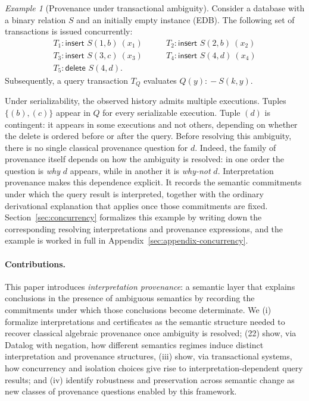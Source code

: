 \documentclass[acmsmall,nonacm]{acmart}
\theoremstyle{remark}
\newtheorem{example}{Example}
\numberwithin{definition}{section}
\numberwithin{theorem}{section}
\numberwithin{lemma}{section}
\numberwithin{corollary}{section}
\numberwithin{remark}{section}
\numberwithin{example}{section}
\numberwithin{observation}{section}
\numberwithin{assumption}{section}
\newcommand{\drule}{\mathrel{:\!-}}
\begin{document}
\begin{example}[Provenance under transactional ambiguity]
  \label{ex:example}
Consider a database with a binary relation $S$ 
and an initially empty instance (EDB).
The following set of transactions is issued concurrently:
\[
\begin{array}{ll}
T_1: \textsf{insert } S(1,b) \ (x_1) \qquad &
T_2: \textsf{insert } S(2,b) \ (x_2)\\
T_3: \textsf{insert } S(3,c) \ (x_3) \qquad &
T_4: \textsf{insert } S(4,d) \ (x_4)\\
T_5: \textsf{delete } S(4,d). &
\end{array}
\]
Subsequently, a query transaction $T_Q$ evaluates $Q(y) \drule S(k,y)$.

Under serializability, the observed history admits multiple executions.
Tuples $\{(b), (c)\}$ appear in $Q$ for every serializable execution.
Tuple $(d)$ is contingent: it appears in some executions and not others, depending
on whether the delete is ordered before or after the query. Before resolving this
ambiguity, there is no single classical provenance question for $d$. Indeed,
the family of provenance itself depends on how the ambiguity is resolved: in 
one order the question is \emph{why} $d$ appears, while in another it is \emph{why-not} $d$.
Interpretation provenance makes this dependence explicit.
It records the semantic commitments under which the query result is interpreted,
together with the ordinary derivational explanation that applies once those
commitments are fixed.
Section~\ref{sec:concurrency} formalizes this example by writing down the corresponding
resolving interpretations and provenance expressions, and the example is 
worked in full in Appendix~\ref{sec:appendix-concurrency}.
\end{example}

\paragraph{Contributions.}
This paper introduces \emph{interpretation provenance}: a semantic layer that
explains conclusions in the presence of ambiguous semantics by recording the
commitments under which those conclusions become determinate.
We (i) formalize interpretations and certificates as the semantic structure
needed to recover classical algebraic provenance once ambiguity is resolved;
(22) show, via Datalog with negation, how different semantics regimes induce
distinct interpretation and provenance structures, (iii) show, via transactional
systems, how concurrency and isolation choices give rise to interpretation-dependent
query results; and (iv) identify robustness and preservation across semantic change
as new classes of provenance questions enabled by this framework.
\end{document}
